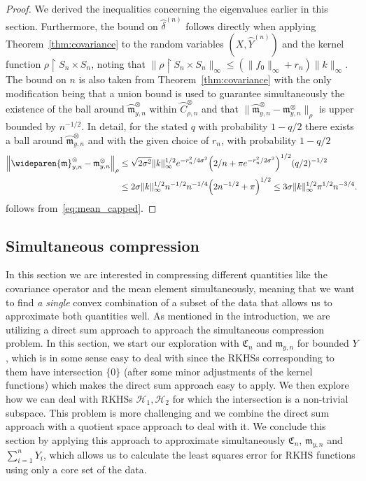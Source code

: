 \documentclass[10pt]{amsart}
\theoremstyle{definition}\newtheorem{defi}[theo]{Definition}\newtheorem{rema}[theo]{Remark}\newtheorem{exam}[theo]{Example}\newtheorem{exem}[theo]{Example}\newtheorem{nota}[theo]{Notation}
\theoremstyle{remark}
\newcommand{\restrr}
{\!\!\upharpoonright\!\!}
\newcommand{\cH}{\mathcal{H}}
\newcommand{\fkC}{\mathfrak{C}}
\newcommand{\mean}{\mathfrak{m}}
\let\originalleft\left
\let\originalright\right
\renewcommand{\left}{\mathopen{}\mathclose\bgroup\originalleft}
\renewcommand{\right}{\aftergroup\egroup\originalright}
\begin{document}
\begin{proof}
We derived the inequalities concerning the eigenvalues earlier in this section. Furthermore, the bound on $\wideparen{\delta}^{(n)}$ follows directly when applying Theorem~\ref{thm:covariance} to the random variables $(X,\wideparen{Y}^{(n)})$ and the kernel function $\rho\restrr S_n \times S_n$, noting that $\|\rho\restrr S_n \times S_n\|_\infty \leq (\|f_0\|_\infty + r_n) \|k\|_\infty $. The bound on $n$ is also taken from Theorem~\ref{thm:covariance} with the only modification being that a union bound is used to guarantee simultaneously the existence of the ball around $\wideparen{\mean}^\otimes_{y,n}$ within $\wideparen{C}^{\otimes}_{\rho,n}$ and that $\|\wideparen{\mean}^\otimes_{y,n} - \mean_{y,n}^\otimes \|_\rho$ is upper bounded by $n^{-1/2}$. In detail, for the stated $q$ with probability $1- q/2$ there exists a ball around $ \wideparen{\mean}^\otimes_{y,n}$ and with the given choice of $r_n$, with probability $1- q/2$
\begin{align*}
\left\|\wideparen{\mean}^\otimes_{y,n} - \mean_{y,n}^\otimes \right\|_\rho &\leq \sqrt{2 \sigma^2} \|k\|^{1/2}_\infty e^{-r_n^2/4 \sigma^2} \Bigl(2/n + \pi e^{-r_n^2/2 \sigma^2} \Bigr)^{1/2} (q/2)^{-1/2} \\
&\leq 2 \sigma \|k\|^{1/2}_\infty n^{-1/2} n^{-1/4} \left(2 n^{-1/2} + \pi\right)^{1/2} \leq 3 \sigma \|k\|_\infty^{1/2} \pi^{1/2} n^{-3/4}.
\end{align*}
follows from~\eqref{eq:mean_capped}.
\end{proof}



\subsection{Simultaneous compression} \label{sec:simultaneous}
In this section we are interested in compressing different quantities like the covariance operator and the mean element simultaneously, meaning that we want to find \emph{a single} convex combination of a subset of the data that allows us to approximate both quantities well. As mentioned in the introduction, we are utilizing a direct sum approach to approach the simultaneous compression problem. In this section, we start our exploration with $\fkC_n$ and $\mean_{y,n}$ for bounded $Y$, which is in some sense easy to deal with since the RKHSs corresponding to them have intersection $\{0\}$ (after some minor adjustments of the kernel functions) which makes the direct sum approach easy to apply. We then explore how we can deal with RKHSs $\cH_1,\cH_2$ for which the intersection is a non-trivial subspace. This problem is more challenging and we combine the direct sum approach with a quotient space approach to deal with it. We conclude this section by applying this approach to approximate simultaneously $\fkC_n$, $\mean_{y,n}$ and $\sum_{i=1}^n Y_i$, which allows us to calculate the least squares error for RKHS functions using only a core set of the data.
\end{document}
